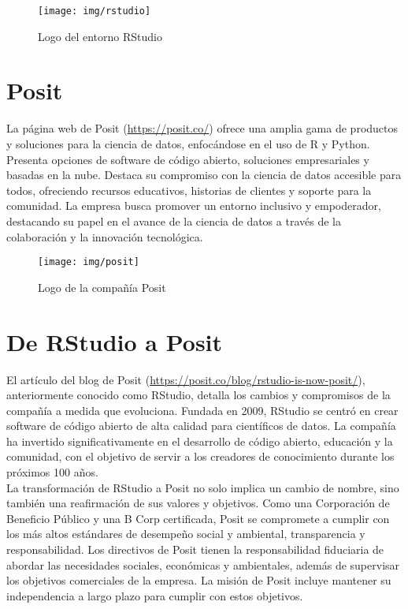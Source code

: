 \documentclass[12pt]{report}\usepackage[]{graphicx}\usepackage[dvipsnames]{xcolor}
\begin{document}
			\begin{figure}[H]
				\centering
				\texttt{[image: img/rstudio]}
				\caption{Logo del entorno RStudio}
				\label{fig:logo_rstudio}
			\end{figure}
			
		\section*{Posit}
			
			La página web de Posit (\url{https://posit.co/}) ofrece una amplia gama de productos y soluciones para la ciencia de datos, enfocándose en el uso de R y Python. Presenta opciones de software de código abierto, soluciones empresariales y basadas en la nube. Destaca su compromiso con la ciencia de datos accesible para todos, ofreciendo recursos educativos, historias de clientes y soporte para la comunidad. La empresa busca promover un entorno inclusivo y empoderador, destacando su papel en el avance de la ciencia de datos a través de la colaboración y la innovación tecnológica.
				
			\begin{figure}[H]
				\centering
				\texttt{[image: img/posit]}
				\caption{Logo de la compañía Posit}
				\label{fig:logo_posit}
			\end{figure}
	
		\section*{De RStudio a Posit}
	
			El artículo del blog de Posit (\url{https://posit.co/blog/rstudio-is-now-posit/}), anteriormente conocido como RStudio, detalla los cambios y compromisos de la compañía a medida que evoluciona. Fundada en 2009, RStudio se centró en crear software de código abierto de alta calidad para científicos de datos. La compañía ha invertido significativamente en el desarrollo de código abierto, educación y la comunidad, con el objetivo de servir a los creadores de conocimiento durante los próximos 100 años.\\
			
			La transformación de RStudio a Posit no solo implica un cambio de nombre, sino también una reafirmación de sus valores y objetivos. Como una Corporación de Beneficio Público y una B Corp certificada, Posit se compromete a cumplir con los más altos estándares de desempeño social y ambiental, transparencia y responsabilidad. Los directivos de Posit tienen la responsabilidad fiduciaria de abordar las necesidades sociales, económicas y ambientales, además de supervisar los objetivos comerciales de la empresa. La misión de Posit incluye mantener su independencia a largo plazo para cumplir con estos objetivos.\\
			
\end{document}
